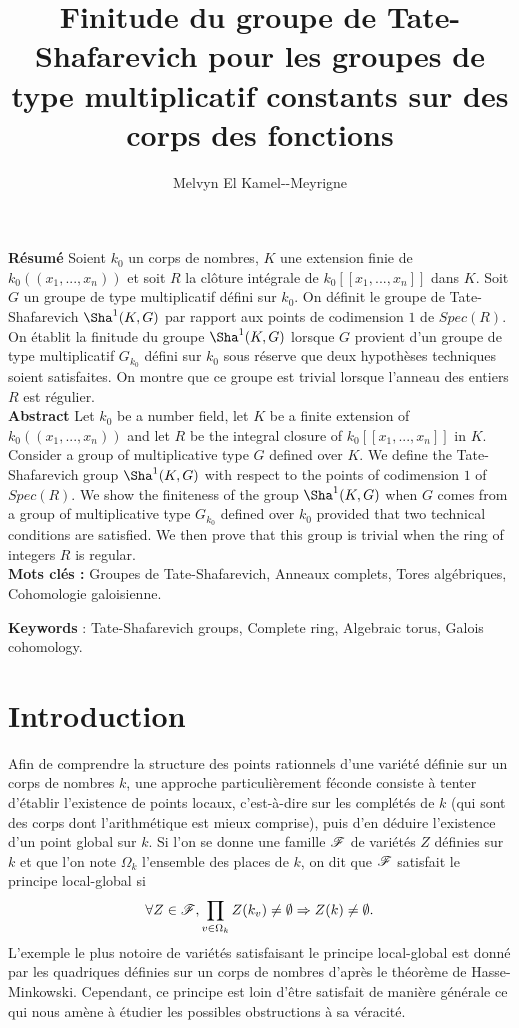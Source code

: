 \documentclass[11pt]{article}
\title{Finitude du groupe de Tate-Shafarevich pour les groupes de type multiplicatif constants sur des corps des fonctions}
\author{Melvyn El Kamel-{}-Meyrigne}
\date{}
\begin{document}
\maketitle


\textbf{Résumé} Soient $k_0$ un corps de nombres, $K$ une extension finie de $k_0(\!(x_1,...,x_n)\!)$ et soit $R$ la clôture intégrale de $k_0[[x_1,...,x_n]]$ dans $K$. Soit $G$ un groupe de type multiplicatif défini sur $k_0$. On définit le groupe de Tate-Shafarevich $\Sha^1(K,G)$ par rapport aux points de codimension $1$ de $Spec(R)$. On établit la finitude du groupe  $\Sha^1(K,G)$ lorsque $G$ provient d'un groupe de type multiplicatif $G_{k_0}$ défini sur $k_0$ sous réserve que deux hypothèses techniques soient satisfaites. On montre que ce groupe est trivial lorsque l'anneau des entiers $R$ est régulier.\\

\textbf{Abstract} Let $k_0$ be a number field, let $K$ be a finite extension of $k_0(\!(x_1,...,x_n)\!)$ and let $R$ be the integral closure of $k_0[[x_1,...,x_n]]$ in $K$. Consider a group of multiplicative type $G$ defined over $K$. We define the Tate-Shafarevich group $\Sha^1(K,G)$ with respect to the points of codimension $1$ of $Spec(R)$. We show the finiteness of the group $\Sha^1(K,G)$ when $G$ comes from a group of multiplicative type $G_{k_0}$ defined over $k_0$ provided that two technical conditions are satisfied. We then prove that this group is trivial when the ring of integers $R$ is regular.\\

\textbf{Mots clés :} Groupes de Tate-Shafarevich, Anneaux complets, Tores algébriques, Cohomologie galoisienne.

\textbf{Keywords} : Tate-Shafarevich
groups, Complete ring, Algebraic torus, Galois cohomology.

\section{Introduction}

Afin de comprendre la structure des points rationnels d'une variété définie sur un corps de nombres $k$, une approche particulièrement féconde consiste à tenter d'établir l'existence de points locaux, c'est-à-dire sur les complétés de $k$ (qui sont des corps dont l'arithmétique est mieux comprise), puis d'en déduire l'existence d'un point global sur $k$. Si l'on se donne une famille $\mathscr{F}$ de variétés $Z$ définies sur $k$ et que l'on note $\Omega_k$ l'ensemble des places de $k$, on dit que $\mathscr{F}$ satisfait le principe local-global si
$$
\forall Z \in \mathscr{F}, \prod_{v \in \Omega_k}Z(k_v) \neq \emptyset \Rightarrow Z(k) \neq \emptyset.
$$
L'exemple le plus notoire de variétés satisfaisant le principe local-global est donné par les quadriques définies sur un corps de nombres d'après le théorème de Hasse-Minkowski. Cependant, ce principe est loin d'être satisfait de manière générale ce qui nous amène à étudier les possibles obstructions à sa véracité.\\
\end{document}
